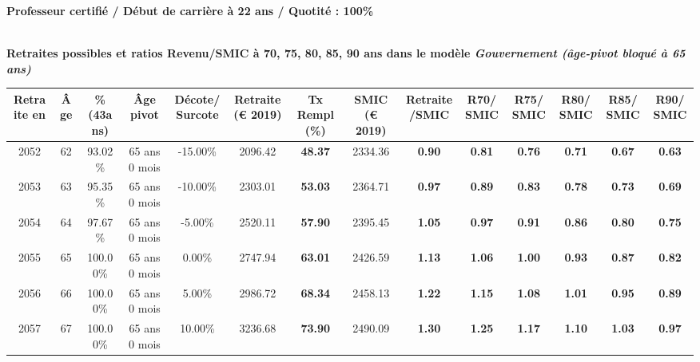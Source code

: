 {\bf \noindent Professeur certifié / Début de carrière à 22 ans / Quotité : 100\%}  ~ 

 ~\\{\bf \noindent Retraites possibles et ratios Revenu/SMIC à 70, 75, 80, 85, 90 ans dans le modèle \emph{Gouvernement (âge-pivot bloqué à 65 ans)}}  
 
\begin{adjustbox}{max width=\textwidth} 
\begin{tabular}[htb]{|c|c||c|c|c||c|c||c|c||c|c|c|c|c|} 
\hline 
 Retraite en &  Âge &  \%(43ans) &  Âge pivot &  Décote/Surcote &  Retraite (\euro{} 2019) &  Tx Rempl(\%) &  SMIC (\euro{} 2019) &  Retraite/SMIC &  R70/SMIC &  R75/SMIC &  R80/SMIC &  R85/SMIC &  R90/SMIC \\ 
\hline \hline 
 2052 &  62 &  93.02\% &  65 ans 0 mois &  -15.00\% &  2096.42 &  {\bf 48.37} &  2334.36 &  {\bf {\color{red} 0.90}} &  {\bf {\color{red} 0.81}} &  {\bf {\color{red} 0.76}} &  {\bf {\color{red} 0.71}} &  {\bf {\color{red} 0.67}} &  {\bf {\color{red} 0.63}} \\ 
\hline 
 2053 &  63 &  95.35\% &  65 ans 0 mois &  -10.00\% &  2303.01 &  {\bf 53.03} &  2364.71 &  {\bf {\color{red} 0.97}} &  {\bf {\color{red} 0.89}} &  {\bf {\color{red} 0.83}} &  {\bf {\color{red} 0.78}} &  {\bf {\color{red} 0.73}} &  {\bf {\color{red} 0.69}} \\ 
\hline 
 2054 &  64 &  97.67\% &  65 ans 0 mois &  -5.00\% &  2520.11 &  {\bf 57.90} &  2395.45 &  {\bf 1.05} &  {\bf {\color{red} 0.97}} &  {\bf {\color{red} 0.91}} &  {\bf {\color{red} 0.86}} &  {\bf {\color{red} 0.80}} &  {\bf {\color{red} 0.75}} \\ 
\hline 
 2055 &  65 &  100.00\% &  65 ans 0 mois &  0.00\% &  2747.94 &  {\bf 63.01} &  2426.59 &  {\bf 1.13} &  {\bf 1.06} &  {\bf {\color{red} 1.00}} &  {\bf {\color{red} 0.93}} &  {\bf {\color{red} 0.87}} &  {\bf {\color{red} 0.82}} \\ 
\hline 
 2056 &  66 &  100.00\% &  65 ans 0 mois &  5.00\% &  2986.72 &  {\bf 68.34} &  2458.13 &  {\bf 1.22} &  {\bf 1.15} &  {\bf 1.08} &  {\bf 1.01} &  {\bf {\color{red} 0.95}} &  {\bf {\color{red} 0.89}} \\ 
\hline 
 2057 &  67 &  100.00\% &  65 ans 0 mois &  10.00\% &  3236.68 &  {\bf 73.90} &  2490.09 &  {\bf 1.30} &  {\bf 1.25} &  {\bf 1.17} &  {\bf 1.10} &  {\bf 1.03} &  {\bf {\color{red} 0.97}} \\ 
\hline 
\hline 
\end{tabular} 
\end{adjustbox} 
 
